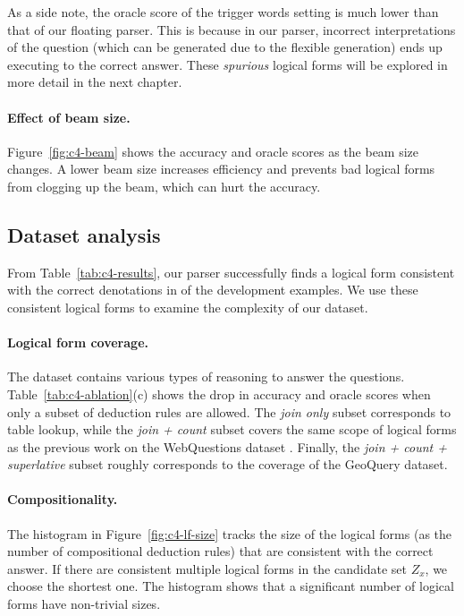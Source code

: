 As a side note, the oracle score of the trigger words setting
is much lower than that of our floating parser.
This is because in our parser,
incorrect interpretations of the question
(which can be generated due to the flexible generation)
ends up executing to the correct answer.
These \emph{spurious} logical forms will be explored
in more detail in %
the next chapter.

\paragraph{Effect of beam size.}
Figure~\ref{fig:c4-beam}
shows the accuracy and oracle scores
as the beam size changes.
A lower beam size increases efficiency
and prevents bad logical forms from clogging up the beam,
which can hurt the accuracy.

\subsection{Dataset analysis}
From Table~\ref{tab:c4-results},
our parser successfully finds a logical form
consistent with the correct denotations in
\qqq of the development examples.
We use these consistent logical forms
to examine the complexity of our dataset.

\paragraph{Logical form coverage.}
The \wtq dataset contains various types of reasoning
to answer the questions.
Table~\ref{tab:c4-ablation}(c) shows the drop in accuracy
and oracle scores
when only a subset of deduction rules are allowed.
The \emph{join only} subset corresponds to table lookup,
while the \emph{join + count} subset covers the same scope
of logical forms as the previous work on the WebQuestions dataset
\cite{Berant2013SemanticPO}.
Finally, the \emph{join + count + superlative} subset
roughly corresponds to the coverage of the GeoQuery dataset.


\paragraph{Compositionality.}
The histogram in Figure~\ref{fig:c4-lf-size}
tracks the size of the logical forms
(as the number of compositional deduction rules)
that are consistent with the correct answer.
If there are consistent multiple logical forms in
the candidate set $Z_x$, we choose the shortest one.
The histogram shows that a significant number of logical forms
have non-trivial sizes.

